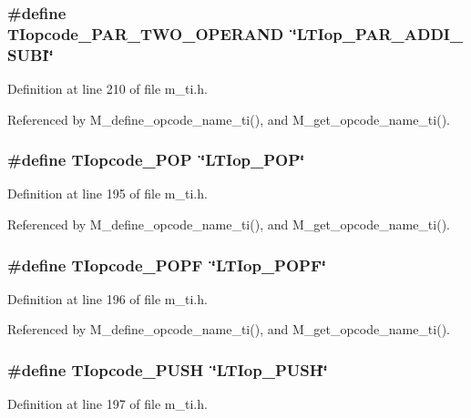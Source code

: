 \subsubsection{\setlength{\rightskip}{0pt plus 5cm}\#define TIopcode\_\-PAR\_\-TWO\_\-OPERAND~\char`\"{}LTIop\_\-PAR\_\-ADDI\_\-SUBI\char`\"{}}\label{m__ti_8h_93a037a4b7a431d6ae7ff34e5eac320a}




Definition at line 210 of file m\_\-ti.h.

Referenced by M\_\-define\_\-opcode\_\-name\_\-ti(), and M\_\-get\_\-opcode\_\-name\_\-ti().
\subsubsection{\setlength{\rightskip}{0pt plus 5cm}\#define TIopcode\_\-POP~\char`\"{}LTIop\_\-POP\char`\"{}}\label{m__ti_8h_f2b162bde4dfb36538f6eefdd3439df6}




Definition at line 195 of file m\_\-ti.h.

Referenced by M\_\-define\_\-opcode\_\-name\_\-ti(), and M\_\-get\_\-opcode\_\-name\_\-ti().
\subsubsection{\setlength{\rightskip}{0pt plus 5cm}\#define TIopcode\_\-POPF~\char`\"{}LTIop\_\-POPF\char`\"{}}\label{m__ti_8h_e6ebdcc3ef75702c2299f3396a5193a8}




Definition at line 196 of file m\_\-ti.h.

Referenced by M\_\-define\_\-opcode\_\-name\_\-ti(), and M\_\-get\_\-opcode\_\-name\_\-ti().
\subsubsection{\setlength{\rightskip}{0pt plus 5cm}\#define TIopcode\_\-PUSH~\char`\"{}LTIop\_\-PUSH\char`\"{}}\label{m__ti_8h_b6c02e95b1efcbeb8a3df137177a739c}




Definition at line 197 of file m\_\-ti.h.

